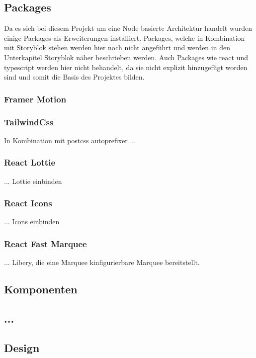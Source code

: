 \subsection{Packages}
Da es sich bei diesem Projekt um eine Node basierte Architektur handelt wurden einige Packages als Erweiterungen installiert. Packages, welche in Kombination mit Storyblok stehen werden hier noch nicht angeführt und werden in den Unterkapitel Storyblok näher beschrieben werden. Auch Packages wie react und typescript werden hier nicht behandelt, da sie nicht explizit hinzugefügt worden sind und somit die Basis des Projektes bilden.

\subsubsection*{Framer Motion}

\subsubsection*{TailwindCss}
In Kombination mit postcss autoprefixer ...

\subsubsection*{React Lottie}
... Lottie einbinden

\subsubsection*{React Icons}
... Icons einbinden

\subsubsection*{React Fast Marquee}
... Libery, die eine Marquee kinfigurierbare Marquee bereitstellt.

\subsection{Komponenten}

\subsection{...}

\subsection{Design}

